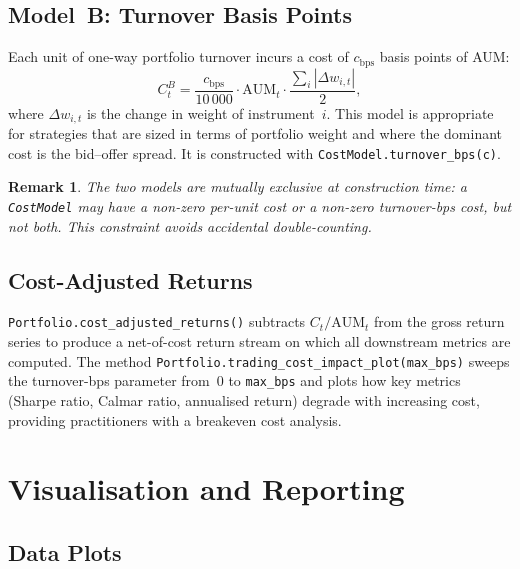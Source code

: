 \documentclass[11pt,a4paper]{article}
\newtheorem{remark}{Remark}
\begin{document}
\subsection{Model~B: Turnover Basis Points}

Each unit of one-way portfolio turnover incurs a cost of $c_{\text{bps}}$
basis points of AUM:
\begin{equation}
  C_t^B = \frac{c_{\text{bps}}}{10\,000} \cdot \mathrm{AUM}_t \cdot
          \frac{\sum_i |\Delta w_{i,t}|}{2},
\end{equation}
where $\Delta w_{i,t}$ is the change in weight of instrument~$i$.  This model
is appropriate for strategies that are sized in terms of portfolio weight and
where the dominant cost is the bid–offer spread.  It is constructed with
\texttt{CostModel.turnover\_bps(c)}.

\begin{remark}
The two models are mutually exclusive at construction time: a \texttt{CostModel}
may have a non-zero per-unit cost or a non-zero turnover-bps cost, but not both.
This constraint avoids accidental double-counting.
\end{remark}

\subsection{Cost-Adjusted Returns}

\texttt{Portfolio.cost\_adjusted\_returns()} subtracts $C_t / \mathrm{AUM}_t$
from the gross return series to produce a net-of-cost return stream on which
all downstream metrics are computed.  The method
\texttt{Portfolio.trading\_cost\_impact\_plot(max\_bps)} sweeps the
turnover-bps parameter from~0 to \texttt{max\_bps} and plots how key metrics
(Sharpe ratio, Calmar ratio, annualised return) degrade with increasing cost,
providing practitioners with a breakeven cost analysis.

\section{Visualisation and Reporting}
\label{sec:plots}

\subsection{Data Plots}
\end{document}
